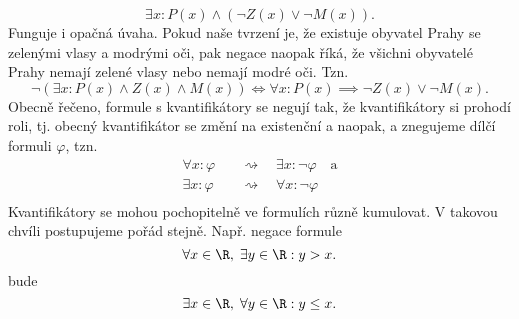 \begin{equation*}
    \exists x : P(x)\land (\neg Z(x) \lor \neg M(x)).
\end{equation*}
Funguje i opačná úvaha. Pokud naše tvrzení je, že existuje obyvatel Prahy se zelenými vlasy a modrými oči, pak negace naopak říká, že všichni obyvatelé Prahy nemají zelené vlasy nebo nemají modré oči. Tzn.
\begin{equation*}
    \neg(\exists x : P(x)\land Z(x) \land M(x)) \iff \forall x : P(x)\implies \neg Z(x) \lor \neg M(x).
\end{equation*}
Obecně řečeno, formule s kvantifikátory se negují tak, že kvantifikátory si prohodí roli, tj. obecný kvantifikátor se změní na existenční a naopak, a znegujeme dílčí formuli $\varphi$, tzn.
\begin{align*}
    \forall x : \varphi\quad&\rightsquigarrow\quad\exists x : \neg\varphi\quad\text{a}\\
    \exists x : \varphi\quad&\rightsquigarrow\quad\forall x : \neg\varphi\\
\end{align*}
Kvantifikátory se mohou pochopitelně ve formulích různě kumulovat. V takovou chvíli postupujeme pořád stejně. Např. negace formule
\begin{equation*}
    \forall x\in\R,\;\exists y\in\R : y > x.
\end{equation*}
bude
\begin{equation*}
    \exists x\in\R,\;\forall y\in\R : y \leq x.
\end{equation*}

